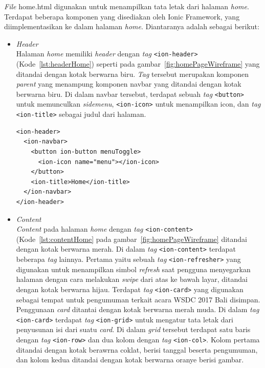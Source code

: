 \begin{enumerate}
\begin{enumerate}
\textit{File} home.html digunakan untuk menampilkan tata letak dari halaman \textit{home}. Terdapat beberapa komponen yang disediakan oleh Ionic Framework, yang diimplementasikan ke dalam halaman \textit{home}. Diantaranya adalah sebagai berikut:	

	\begin{itemize}
		\item \textit{Header} \\
		Halaman \textit{home} memiliki \textit{header} dengan \textit{tag} \texttt{<ion-header>} (Kode~\ref{lst:headerHome}) seperti pada gambar~\ref{fig:homePageWireframe} yang ditandai dengan kotak berwarna biru. \textit{Tag} tersebut merupakan komponen \textit{parent} yang menampung komponen navbar yang ditandai dengan kotak berwarna biru. Di dalam navbar tersebut, terdapat sebuah \textit{tag} \texttt{<button>} untuk memunculkan \textit{sidemenu}, \texttt{<ion-icon>} untuk menampilkan icon, dan \textit{tag} \texttt{<ion-title>} sebagai judul dari halaman.
		
\begin{lstlisting}[label={lst:headerHome}, caption=\textit{Header} pada home.html]
<ion-header>
  <ion-navbar>
    <button ion-button menuToggle>
      <ion-icon name="menu"></ion-icon>
    </button>
    <ion-title>Home</ion-title>
  </ion-navbar>
</ion-header>
\end{lstlisting}

		\item \textit{Content} \\
		\textit{Content} pada halaman \textit{home} dengan \textit{tag} \texttt{<ion-content>} (Kode~\ref{lst:contentHome} pada gambar~\ref{fig:homePageWireframe} ditandai dengan kotak berwarna merah. Di dalam \textit{tag} \texttt{<ion-content>} terdapat beberapa \textit{tag} lainnya. Pertama yaitu sebuah \textit{tag} \texttt{<ion-refresher>} yang digunakan untuk menampilkan simbol \textit{refresh} saat pengguna menyegarkan halaman dengan cara melakukan \textit{swipe} dari atas ke bawah layar, ditandai dengan kotak berwarna hijau. Terdapat \textit{tag} \texttt{<ion-card>} yang digunakan sebagai tempat untuk pengumuman terkait acara WSDC 2017 Bali disimpan. Penggunaan \textit{card} ditantai dengan kotak berwarna merah muda. Di dalam \textit{tag} \texttt{<ion-card>} terdapat \textit{tag} \texttt{<ion-grid>} untuk mengatur tata letak dari penyusunan isi dari suatu \textit{card}. Di dalam \textit{grid} tersebut terdapat satu baris dengan \textit{tag} \texttt{<ion-row>} dan dua kolom dengan \textit{tag} \texttt{<ion-col>}. Kolom pertama ditandai dengan kotak berawrna coklat, berisi tanggal beserta pengumuman, dan kolom kedua ditandai dengan kotak berwarna oranye berisi gambar.
		

\end{itemize}
\end{enumerate}
\end{enumerate}
